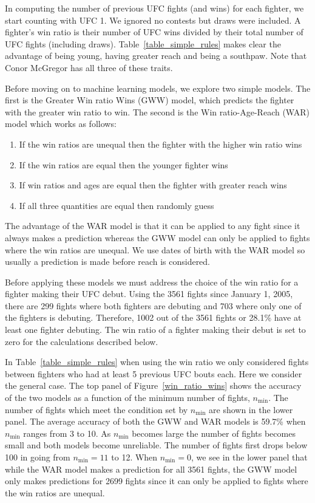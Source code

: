 In computing the number of previous UFC fights (and wins) for each fighter, we start
counting with UFC 1. We ignored no contests but draws were included. A fighter's
win ratio is their number of UFC wins divided by their
total number of UFC fights (including draws).
Table~\ref{table_simple_rules} makes clear the advantage of being young, having
greater reach and being a southpaw. Note that Conor McGregor has all three of
these traits.

Before moving on to machine learning models, we explore two simple
models. The first is the Greater Win ratio Wins (GWW) model,
which predicts the fighter with the greater win ratio to win. The
second is the Win ratio-Age-Reach (WAR) model which works as follows:

\begin{enumerate}[noitemsep]
\item If the win ratios are unequal then the fighter with the higher win ratio wins
\item If the win ratios are equal then the younger fighter wins
\item If win ratios and ages are equal then the fighter with greater reach wins
\item If all three quantities are equal then randomly guess
\end{enumerate}

\noindent
The advantage of the WAR model is that it can be applied to any fight
since it always makes a prediction whereas the GWW model can only be applied
to fights where the win ratios are unequal. We use dates of birth with the
WAR model so usually a prediction is made before reach is considered.

Before applying these models we must address the choice of the win
ratio for a fighter making their UFC debut.
Using the 3561 fights since January 1, 2005, there are
299 fights where both fighters are debuting and 703 where only one
of the fighters is debuting. Therefore, 1002 out of the 3561 fights or
28.1\% have at least one fighter debuting.
The win ratio of a fighter making their debut is
set to zero for the calculations described below.

In Table~\ref{table_simple_rules} when using the win ratio we only
considered fights between fighters who had at least 5 previous UFC bouts each.
Here we consider the general case.
The top panel of Figure~\ref{win_ratio_wins} shows the accuracy
of the two models as a
function of the minimum number of fights, $n_{\textrm{min}}$.
The number of fights which meet the condition
set by $n_{\textrm{min}}$ are shown in the
lower panel.
The average accuracy of both the GWW and WAR models is 59.7\% when
$n_{\textrm{min}}$ ranges from 3 to 10. As $n_{\textrm{min}}$ becomes
large the number of fights becomes small and both models
become unreliable. The number of fights first drops below 100 in
going from $n_{\textrm{min}}=11$ to 12. When $n_{\textrm{min}}=0$,
we see in the lower panel that while the WAR model makes
a prediction for all 3561 fights, the GWW model only makes predictions for 2699 fights
since it can only be applied to fights where the win ratios are unequal.

